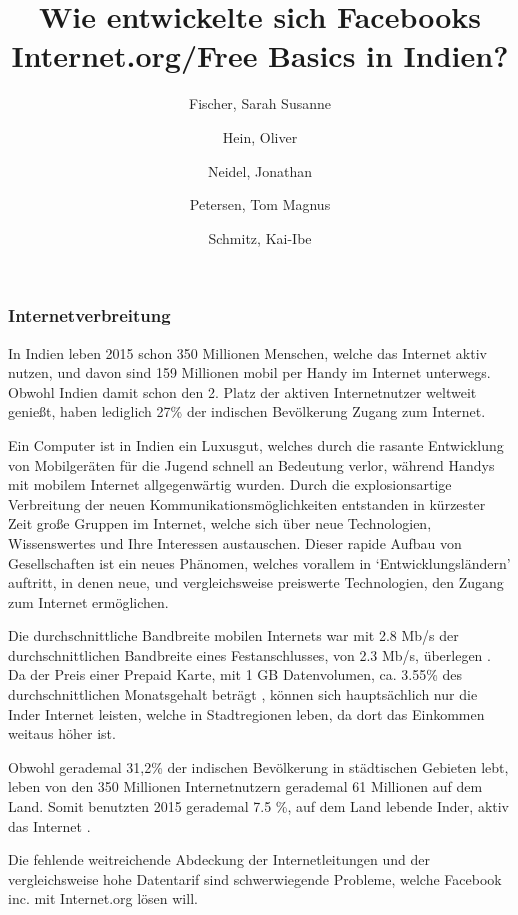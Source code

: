 \documentclass{article}
\title{Wie entwickelte sich Facebooks Internet.org/Free Basics in Indien?}
\author{
  Fischer, Sarah Susanne\\
  \and
  Hein, Oliver\\
  \and
  Neidel, Jonathan\\
  \and
  Petersen, Tom Magnus\\
  \and
  Schmitz, Kai-Ibe\\
}
\begin{document}
\maketitle
\subsubsection{Internetverbreitung}

In Indien leben 2015 schon 350 Millionen Menschen\autocite{slideshareIndia}, welche das Internet aktiv nutzen, und davon sind 159 Millionen mobil per Handy im Internet unterwegs. Obwohl Indien damit schon den 2. Platz der aktiven Internetnutzer weltweit genießt, haben lediglich 27\% der indischen Bevölkerung Zugang zum Internet\autocite{InternetCountry}.
\medskip 

Ein Computer ist in Indien ein Luxusgut, welches durch die rasante Entwicklung von Mobilgeräten für die Jugend schnell an Bedeutung verlor, während Handys mit mobilem Internet allgegenwärtig wurden.
Durch die explosionsartige Verbreitung der neuen Kommunikationsmöglichkeiten entstanden in kürzester Zeit große Gruppen im Internet, welche sich über neue Technologien, Wissenswertes und Ihre Interessen austauschen.
Dieser rapide Aufbau von Gesellschaften ist ein neues Phänomen, welches vorallem in `Entwicklungsländern' auftritt, in denen neue, und vergleichsweise preiswerte Technologien, den Zugang zum Internet ermöglichen.   \textcite{empowermentThroughFacebook}

\medskip
Die durchschnittliche Bandbreite mobilen Internets war mit 2.8 Mb/s der durchschnittlichen Bandbreite eines Festanschlusses, von 2.3 Mb/s, überlegen \autocite{slideshareIndia}.
Da der Preis einer Prepaid Karte, mit 1 GB Datenvolumen, ca. 3.55\% des durchschnittlichen Monatsgehalt beträgt \autocite{broadbandAgency}, können sich hauptsächlich nur die Inder Internet leisten, welche in Stadtregionen leben, da dort das Einkommen weitaus höher ist.

 Obwohl gerademal 31,2\% der indischen Bevölkerung in städtischen Gebieten lebt, leben von den 350 Millionen Internetnutzern gerademal 61 Millionen auf dem Land\autocite{IndiaBevölkerung}. Somit benutzten 2015 gerademal 7.5 \%, auf dem Land lebende Inder, aktiv das Internet \autocite{slideshareIndia}.

Die fehlende weitreichende Abdeckung der Internetleitungen und der vergleichsweise hohe Datentarif sind schwerwiegende Probleme, welche Facebook inc. mit Internet.org lösen will.
\end{document}
